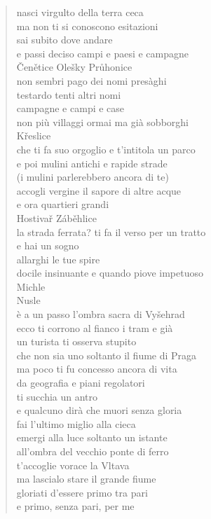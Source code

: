 \clearpage


	\begin{verse}
		nasci virgulto della terra ceca\\
		ma non ti si conoscono esitazioni\\
		sai subito dove andare\\
		e passi deciso campi e paesi e campagne\\
		Čenětice Olešky Průhonice\\
		non sembri pago dei nomi presàghi \\
		testardo tenti altri nomi\\
		campagne e campi e case\\
		non più villaggi ormai ma già sobborghi\\
		Křeslice\\
		che ti fa suo orgoglio e t'intitola un parco\\
		e poi mulini antichi e rapide strade\\
		(i mulini parlerebbero ancora di te)\\
		accogli vergine il sapore di altre acque\\
		e ora quartieri grandi\\
		Hostivař Záběhlice\\
		la strada ferrata? ti fa il verso per un tratto\\
		e hai un sogno\\
		allarghi le tue spire\\
		docile insinuante e quando piove impetuoso\\
		Michle\\
		Nusle\\
		è a un passo l'ombra sacra di Vyšehrad\\
		ecco ti corrono al fianco i tram e già\\
		un turista ti osserva stupito\\
		che non sia uno soltanto il fiume di Praga\\
		ma poco ti fu concesso ancora di vita\\
		da geografia e piani regolatori\\
		ti succhia un antro\\
		e qualcuno dirà che muori senza gloria\\
		fai l'ultimo miglio alla cieca\\
		emergi alla luce soltanto un istante\\
		all'ombra del vecchio ponte di ferro\\
		t'accoglie vorace la Vltava\\
		ma lascialo stare il grande fiume \\
		gloriati d'essere primo tra pari\\
		e primo, senza pari, per me
	\end{verse}

